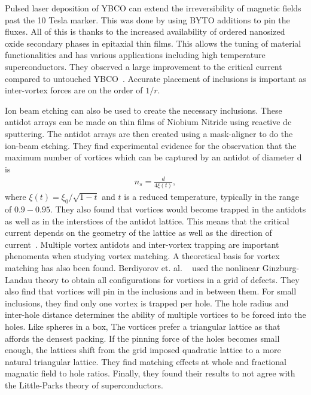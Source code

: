 Pulsed laser deposition of YBCO can extend the irreversibility of magnetic fields past the 10 Tesla marker. This was done by using BYTO additions to pin the fluxes. All of this is thanks to the increased availability of ordered nanosized oxide secondary phases in epitaxial thin films. This allows the tuning of material functionalities and has various applications including high temperature superconductors. They observed a large improvement to the critical current compared to untouched YBCO~\cite{Rizzo16}. Accurate placement of inclusions is important as inter-vortex forces are on the order of $1/r$.      

Ion beam etching can also be used to create the necessary inclusions. These antidot arrays can be made on thin films of Niobium Nitride using reactive dc sputtering. The antidot arrays are then created using a mask-aligner to do the ion-beam etching. They find experimental evidence for the observation that the maximum number of vortices which can be captured by an antidot of diameter d is
\begin{eqnarray}
n_s = \frac {d} {4 \xi(t)}, 
\label{}
\end{eqnarray}
where $\xi(t) = \xi_0 / \sqrt{1-t}$ and $t$ is a reduced temperature, typically in the range of $0.9 - 0.95$. They also found that vortices would become trapped in the antidots as well as in the interstices of the antidot lattice. This means that the critical current depends on the geometry of the lattice as well as the direction of current~\cite{Thakur09}. Multiple vortex antidots and inter-vortex trapping are important phenomenta when studying vortex matching. A theoretical basis for vortex matching has also been found. Berdiyorov et. al. ~\cite{Berdiyorov06} used the nonlinear Ginzburg-Landau theory to obtain all configurations for vortices in a grid of defects. They also find that vortices will pin in the inclusions and in between them. For small inclusions, they find only one vortex is trapped per hole. The hole radius and inter-hole distance determines the ability of multiple vortices to be forced into the holes. Like spheres in a box, The vortices prefer a triangular lattice as that affords the densest packing. If the pinning force of the holes becomes small enough, the lattices shift from the grid imposed quadratic lattice to a more natural triangular lattice. They find matching effects at whole and fractional magnatic field to hole ratios. Finally, they found their results to not agree with the Little-Parks theory of superconductors.

